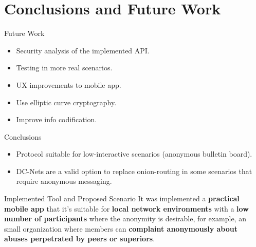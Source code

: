 \section{Conclusions and Future Work}

\begin{frame}{Future Work}
    \begin{itemize}
        \item Security analysis of the implemented API.
        \item Testing in more real scenarios.
        \item UX improvements to mobile app.
        \item Use elliptic curve cryptography.
        \item Improve info codification.
    \end{itemize}
\end{frame}

\begin{frame}{Conclusions}
    \begin{itemize}
        \item Protocol suitable for low-interactive scenarios (anonymous bulletin board).
        \item DC-Nets are a valid option to replace onion-routing in some scenarios that require anonymous messaging.
    \end{itemize}
\end{frame}

\begin{frame}{Implemented Tool and Proposed Scenario}
\justify
It was implemented a \textbf{practical mobile app} that it's suitable for \textbf{local network environments} with a \textbf{low number of participants} where the anonymity is desirable, for example, an small organization where members can \textbf{complaint anonymously about abuses perpetrated by peers or superiors}.
\end{frame}
